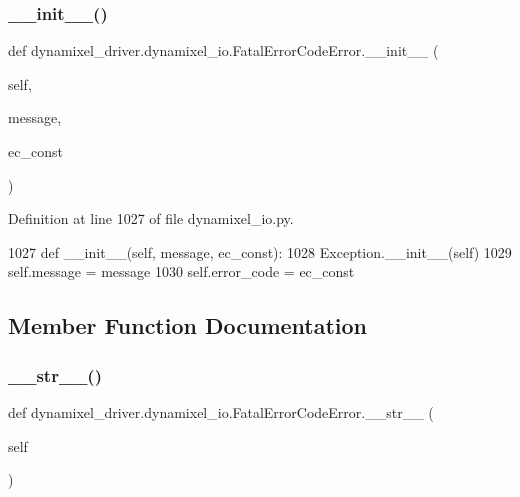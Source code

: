\subsubsection{\texorpdfstring{\+\_\+\+\_\+init\+\_\+\+\_\+()}{\_\_init\_\_()}}
{\footnotesize\ttfamily def dynamixel\+\_\+driver.\+dynamixel\+\_\+io.\+Fatal\+Error\+Code\+Error.\+\_\+\+\_\+init\+\_\+\+\_\+ (\begin{DoxyParamCaption}\item[{}]{self,  }\item[{}]{message,  }\item[{}]{ec\+\_\+const }\end{DoxyParamCaption})}



Definition at line 1027 of file dynamixel\+\_\+io.\+py.


\begin{DoxyCode}
1027     \textcolor{keyword}{def }\_\_init\_\_(self, message, ec\_const):
1028         Exception.\_\_init\_\_(self)
1029         self.message = message
1030         self.error\_code = ec\_const
\end{DoxyCode}


\subsection{Member Function Documentation}
\mbox{\label{classdynamixel__driver_1_1dynamixel__io_1_1_fatal_error_code_error_a493309ba8a6d598d4023b82a1b872745}} 
\subsubsection{\texorpdfstring{\+\_\+\+\_\+str\+\_\+\+\_\+()}{\_\_str\_\_()}}
{\footnotesize\ttfamily def dynamixel\+\_\+driver.\+dynamixel\+\_\+io.\+Fatal\+Error\+Code\+Error.\+\_\+\+\_\+str\+\_\+\+\_\+ (\begin{DoxyParamCaption}\item[{}]{self }\end{DoxyParamCaption})}



